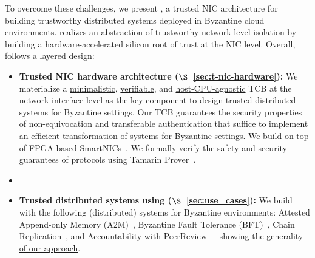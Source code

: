 To overcome these challenges, we present  \projecttitle{}, a trusted NIC architecture for building trustworthy distributed systems deployed in Byzantine cloud environments. \projecttitle{} realizes an abstraction of trustworthy network-level isolation by building a hardware-accelerated silicon root of trust at the NIC level. Overall, \projecttitle{} follows a layered design:
\begin{itemize}[leftmargin=*]
    \item {\bf Trusted NIC hardware architecture ($\S$~\ref{sec:t-nic-hardware}):}  We materialize a \underline{minimalistic}, \underline{verifiable}, and \underline{host-CPU-agnostic} TCB at the network interface level as the key component to design trusted distributed systems for Byzantine settings. Our TCB guarantees the security properties of non-equivocation and transferable authentication that suffice to implement an efficient transformation of systems for Byzantine settings. We build \projecttitle{} on top of FPGA-based SmartNICs~\cite{u280_smartnics}. We formally verify the safety and security guarantees of \projecttitle{} protocols using Tamarin Prover~\cite{tamarin-prover}. 

    \item {}
    
    \item {\bf Trusted distributed systems using \projecttitle{} ($\S$~\ref{sec:use_cases}):} We build with \projecttitle{} the following (distributed) systems for Byzantine environments: Attested Append-only Memory (A2M)~\cite{A2M}, Byzantine Fault Tolerance (BFT)~\cite{pbft}, Chain Replication~\cite{chain-replication}, and Accountability with PeerReview~\cite{peer-review}---showing the \underline{generality of our approach}.
\end{itemize}




